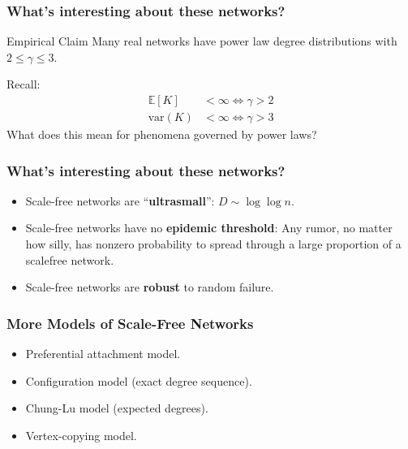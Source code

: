 \documentclass{beamer}
\newcommand\E[0]{\mathbb{E}}
\begin{document}
		
		\begin{frame}\frametitle{What's interesting about these networks?}
			\begin{block}{Empirical Claim}
		  		Many real networks have power law degree distributions with  $2 \leq \gamma \leq 3$.
		  	\end{block}
		  	Recall: 
			\begin{align}
				\E[K] &< \infty \iff \gamma > 2 \\ 
				\text{var} (K) &< \infty \iff \gamma > 3
			\end{align}
		  	What does this mean for phenomena governed by power laws? 
		\end{frame}
	
		
		\begin{frame}\frametitle{What's interesting about these networks?}
		  	\begin{itemize}
		  		\item Scale-free networks are ``\textbf{ultrasmall}'': $D \sim \log \log n$. 
		  		\item Scale-free networks have no \textbf{epidemic threshold}: Any rumor, no matter how silly, has nonzero probability to spread through a large proportion of a scalefree network.
		  		\item Scale-free networks are \textbf{robust} to random failure.
		  	\end{itemize}
		\end{frame}
	
		
		\begin{frame}\frametitle{More Models of Scale-Free Networks}
			\begin{itemize}
				\item Preferential attachment model. 
				\item Configuration model (exact degree sequence).
				\item Chung-Lu model (expected degrees). 
				\item Vertex-copying model.
			\end{itemize}
		\end{frame}
	
\end{document}
